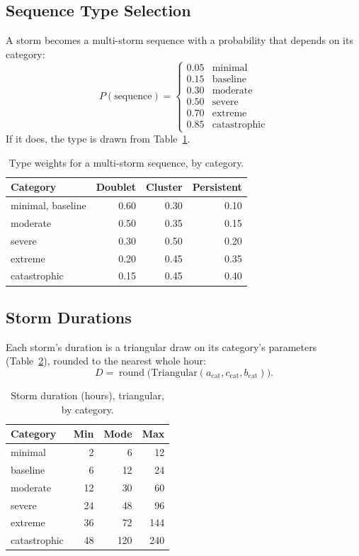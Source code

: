 \documentclass[11pt,a4paper]{article}
\begin{document}
\subsection{Sequence Type Selection}
A storm becomes a multi-storm sequence with a probability that depends on its category:
\begin{equation}
P(\text{sequence}) = \begin{cases}
0.05 & \text{minimal} \\ 0.15 & \text{baseline} \\ 0.30 & \text{moderate} \\
0.50 & \text{severe} \\ 0.70 & \text{extreme} \\ 0.85 & \text{catastrophic}
\end{cases} \label{eq:pseq}
\end{equation}
If it does, the type is drawn from Table~\ref{tab:typew}.
\begin{table}[H]
\centering\small
\caption{Type weights for a multi-storm sequence, by category.}\label{tab:typew}
\begin{tabular}{lrrr}
\toprule
Category & Doublet & Cluster & Persistent \\
\midrule
minimal, baseline & 0.60 & 0.30 & 0.10 \\
moderate & 0.50 & 0.35 & 0.15 \\
severe & 0.30 & 0.50 & 0.20 \\
extreme & 0.20 & 0.45 & 0.35 \\
catastrophic & 0.15 & 0.45 & 0.40 \\
\bottomrule
\end{tabular}
\end{table}

\subsection{Storm Durations}
Each storm's duration is a triangular draw on its category's parameters
(Table~\ref{tab:dur}), rounded to the nearest whole hour:
\begin{equation}
    D = \operatorname{round}\big(\text{Triangular}(a_{\text{cat}}, c_{\text{cat}}, b_{\text{cat}})\big).
    \label{eq:dur}
\end{equation}
\begin{table}[H]
\centering\small
\caption{Storm duration (hours), triangular, by category.}\label{tab:dur}
\begin{tabular}{lrrr}
\toprule
Category & Min & Mode & Max \\
\midrule
minimal & 2 & 6 & 12 \\ baseline & 6 & 12 & 24 \\ moderate & 12 & 30 & 60 \\
severe & 24 & 48 & 96 \\ extreme & 36 & 72 & 144 \\ catastrophic & 48 & 120 & 240 \\
\bottomrule
\end{tabular}
\end{table}
\end{document}
